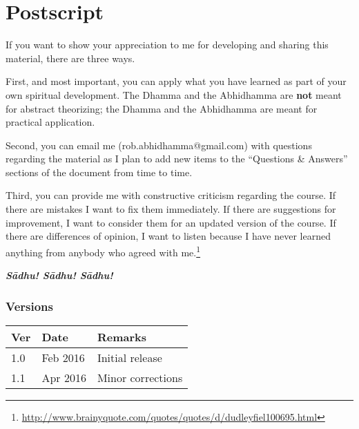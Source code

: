 \section{Postscript}

If you want to show your appreciation to me for developing and sharing this material, there are three ways.

First, and most important, you can apply what you have learned as part of your own spiritual development. The Dhamma and the Abhidhamma are \textbf{not} meant for abstract theorizing; the Dhamma and the Abhidhamma are meant for practical application.

Second, you can email me (rob.abhidhamma@gmail.com) with questions regarding the material as I plan to add new items to the “Questions \& Answers” sections of the document from time to time.

Third, you can provide me with constructive criticism regarding the course. If there are mistakes I want to fix them immediately. If there are suggestions for improvement, I want to consider them for an updated version of the course. If there are differences of opinion, I want to listen because I have never learned anything from anybody who agreed with me.\footnote{\url{http://www.brainyquote.com/quotes/quotes/d/dudleyfiel100695.html}}



\begin{center}
\textbf{\textit{Sādhu! Sādhu! Sādhu!}} \\
\end{center}

\subsubsection*{Versions}
\begin{tabular*}{\textwidth}{lll}
\toprule
\textbf{Ver} & \textbf{Date} & \textbf{Remarks} \\ 
\midrule
1.0 & Feb 2016 & Initial release \\
1.1 & Apr 2016 & Minor corrections \\ 
\bottomrule
\end{tabular*} 

